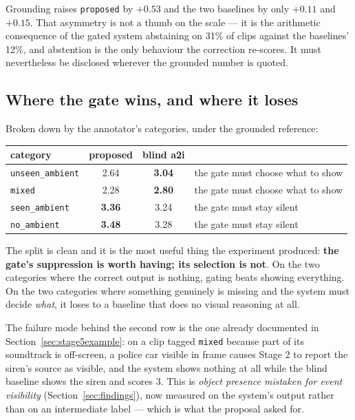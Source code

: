 \documentclass[11pt,a4paper]{article}
\begin{document}
Grounding raises \texttt{proposed} by $+0.53$ and the two baselines by only $+0.11$ and $+0.15$. That
asymmetry is not a thumb on the scale --- it is the arithmetic consequence of the gated system
abstaining on 31\% of clips against the baselines' 12\%, and abstention is the only behaviour the
correction re-scores. It must nevertheless be disclosed wherever the grounded number is quoted.

\subsection{Where the gate wins, and where it loses}
Broken down by the annotator's categories, under the grounded reference:

\begin{center}\begin{tabular}{lccl}
\toprule
category & proposed & blind a2i & \\
\midrule
\texttt{unseen\_ambient} & 2.64 & \textbf{3.04} & the gate must choose what to show \\
\texttt{mixed}           & 2.28 & \textbf{2.80} & the gate must choose what to show \\
\texttt{seen\_ambient}   & \textbf{3.36} & 3.24 & the gate must stay silent \\
\texttt{no\_ambient}     & \textbf{3.48} & 3.28 & the gate must stay silent \\
\bottomrule
\end{tabular}\end{center}

The split is clean and it is the most useful thing the experiment produced: \textbf{the gate's
suppression is worth having; its selection is not}. On the two categories where the correct output is
nothing, gating beats showing everything. On the two categories where something genuinely is missing
and the system must decide \emph{what}, it loses to a baseline that does no visual reasoning at all.

The failure mode behind the second row is the one already documented in
Section~\ref{sec:stage5example}: on a clip tagged \texttt{mixed} because part of its soundtrack is
off-screen, a police car visible in frame causes Stage 2 to report the siren's source as visible, and
the system shows nothing at all while the blind baseline shows the siren and scores 3. This is
\emph{object presence mistaken for event visibility} (Section~\ref{sec:findings}), now measured on the
system's output rather than on an intermediate label --- which is what the proposal asked for.
\end{document}
